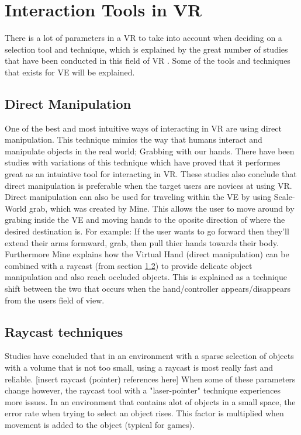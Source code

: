 \section{Interaction Tools in VR}
\label{theory:toolsandtech}
There is a lot of parameters in a VR to take into account when deciding on a selection tool and technique, which is explained by the great number of studies that have been conducted in this field of VR \cite{tools:poupyrev1996go,tools:mine1997moving,tools:Cutler1997,tools:bowman2001introduction}. Some of the tools and techniques that exists for VE will be explained.

\subsection{Direct Manipulation}
One of the best and most intuitive ways of interacting in VR are using direct manipulation.\cite{tools:jacoby1994gestural} This technique mimics the way that humans interact and manipulate objects in the real world; Grabbing with our hands. There have been studies with variations of this technique which have proved that it performes great as an intuiative tool for interacting in VR.\cite{tools:Buchmann2004,tools:Cutler1997} These studies also conclude that direct manipulation is preferable when the target users are novices at using VR. Direct manipulation can also be used for traveling within the VE by using Scale-World grab, which was created by Mine.\cite{tools:mine1997moving} This allows the user to move around by grabing inside the VE and moving hands to the oposite direction of where the desired destination is. For example: If the user wants to go forward then they'll extend their arms formward, grab, then pull thier hands towards their body. Furthermore Mine explains how the Virtual Hand (direct manipulation) can be combined with a raycast (from section \ref{theory:toolsandtech:raycast}) to provide delicate object manipulation and also reach occluded objects. This is explained as a technique shift between the two that occurs when the hand/controller appears/disappears from the users field of view.

\subsection{Raycast techniques}
\label{theory:toolsandtech:raycast}
Studies have concluded that in an environment with a sparse selection of objects with a volume that is not too small, using a raycast is most really fast and reliable. [insert raycast (pointer) references here] When some of these parameters change however, the raycast tool with a "laser-pointer" technique experiences more issues. In an environment that contains alot of objects in a small space, the error rate when trying to select an object rises.\cite{tools:ware1988using} This factor is multiplied when movement is added to the object (typical for games).

